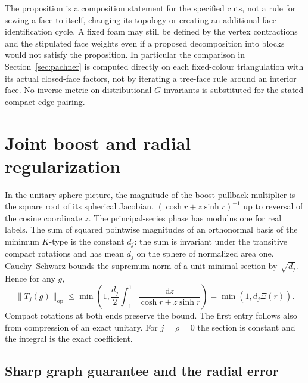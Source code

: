 \documentclass[11pt]{article}
\theoremstyle{remark}
\newcommand{\dd}{\mathrm d}
\begin{document}
The proposition is a composition statement for the specified cuts, not a rule for sewing a face to itself, changing its topology or creating an additional face identification cycle. A fixed foam may still be defined by the vertex contractions and the stipulated face weights even if a proposed decomposition into blocks would not satisfy the proposition. In particular the comparison in Section~\ref{sec:pachner} is computed directly on each fixed-colour triangulation with its actual closed-face factors, not by iterating a tree-face rule around an interior face. No inverse metric on distributional \(G\)-invariants is substituted for the stated compact edge pairing.

\section{Joint boost and radial regularization}\label{sec:rates}

In the unitary sphere picture, the magnitude of the boost pullback multiplier is the square root of its spherical Jacobian,
\((\cosh r+z\sinh r)^{-1}\) up to reversal of the cosine coordinate \(z\). The principal-series phase has modulus one for real labels. The sum of squared pointwise magnitudes of an orthonormal basis of the minimum \(K\)-type is the constant \(d_j\): the sum is invariant under the transitive compact rotations and has mean \(d_j\) on the sphere of normalized area one. Cauchy--Schwarz bounds the supremum norm of a unit minimal section by \(\sqrt{d_j}\). Hence for any \(g\),
\begin{equation}\label{eq:spherbound}
\|T_j(g)\|_{\mathrm{op}}
\le \min\!\left(1,\frac{d_j}{2}\int_{-1}^1\frac{\dd z}{\cosh r+z\sinh r}\right)
=\min(1,d_j\Xi(r)).
\end{equation}
Compact rotations at both ends preserve the bound. The first entry follows also from compression of an exact unitary. For \(j=\rho=0\) the section is constant and the integral is the exact coefficient.

\subsection{Sharp graph guarantee and the radial error}
\end{document}
